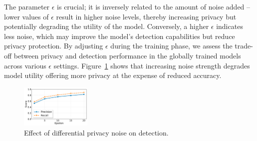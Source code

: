 The parameter $\epsilon$ is crucial; it is inversely related to the amount of noise added -- lower values of $\epsilon$ result in higher noise levels, thereby increasing privacy but potentially degrading the utility of the model. Conversely, a higher $\epsilon$ indicates less noise, which may improve the model's detection capabilities but reduce privacy protection. By adjusting $\epsilon$ during the training phase, we assess the trade-off between privacy and detection performance in the globally trained models across various $\epsilon$ settings. Figure~\ref{epsvsscore} shows that increasing noise strength degrades model utility offering more privacy at the expense of reduced accuracy.

\begin{figure}[!t]
  \centering
  \includegraphics[width=0.3\textwidth]{fig/epsvsscore.pdf}
  \caption{Effect of differential privacy noise on detection. }
  \label{epsvsscore}
  \vspace{-2ex}
\end{figure}


